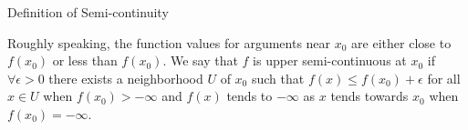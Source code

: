 \documentclass[11pt]{article}
\newcommand*{\xfield}[1]{\begin{mdframed}\centering #1\end{mdframed}\bigskip}
\newenvironment{field}{}{}
\newenvironment{note}{}{}
\begin{document}
\begin{note}
  \xfield{Definition of Semi-continuity}
  \begin{field}
    Roughly speaking, the function values for arguments near \(x_0\)
    are either close to \(f(x_0)\) or less than \(f(x_0)\).
    We say that \(f\) is upper semi-continuous at \(x_0\) if
    \(\forall \epsilon > 0\) there exists a neighborhood \(U\) of
    \(x_0\) such that \(f(x) \leq f(x_0) + \epsilon\) for all
    \(x \in U\) when \(f(x_0) > -\infty\) and \(f(x)\) tends to
    \(- \infty\) as \(x\) tends towards \(x_0\) when
    \(f(x_0) = -\infty\).
  \end{field}
\end{note}
\end{document}
